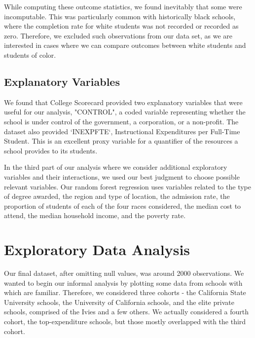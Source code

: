 \documentclass{article}
\begin{document}
While computing these outcome statistics, we found inevitably that some were incomputable. This was particularly common with historically black schools, where the completion rate for white students was not recorded or recorded as zero. Therefore, we excluded such observations from our data set, as we are interested in cases where we can compare outcomes between white students and students of color.

\subsection{Explanatory Variables}

We found that College Scorecard provided two explanatory variables that were useful for our analysis, "CONTROL", a coded variable representing whether the school is under control of the government, a corporation, or a non-profit. The dataset also provided `INEXPFTE`, Instructional Expenditures per Full-Time Student. This is an excellent proxy variable for a quantifier of the resources a school provides to its students.

In the third part of our analysis where we consider additional exploratory variables and their interactions, we used our best judgment to choose possible relevant variables. Our random forest regression uses variables related to the type of degree awarded, the region and type of location, the admission rate, the proportion of students of each of the four races considered, the median cost to attend, the median household income, and the poverty rate.




\section{Exploratory Data Analysis}

Our final dataset, after omitting null values, was around 2000 observations. We wanted to begin our informal analysis by plotting some data from schools with which are familiar. Therefore, we considered three cohorts - the California State University schools, the University of California schools, and the elite private schools, comprised of the Ivies and a few others. We actually considered a fourth cohort, the top-expenditure schools, but those mostly overlapped with the third cohort.
\end{document}
